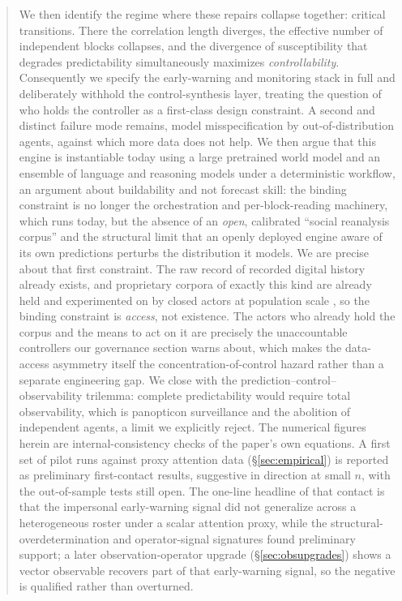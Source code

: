 \documentclass[11pt]{article}
\begin{document}
\begin{abstract}
We then identify the regime where these repairs collapse together: critical transitions. There the correlation length diverges, the effective number of independent blocks collapses, and the divergence of susceptibility that degrades predictability simultaneously maximizes \emph{controllability}. Consequently we specify the early-warning and monitoring stack in full and deliberately withhold the control-synthesis layer, treating the question of who holds the controller as a first-class design constraint. A second and distinct failure mode remains, model misspecification by out-of-distribution agents, against which more data does not help. We then argue that this engine is instantiable today using a large pretrained world model and an ensemble of language and reasoning models under a deterministic workflow, an argument about buildability and not forecast skill: the binding constraint is no longer the orchestration and per-block-reading machinery, which runs today, but the absence of an \emph{open}, calibrated ``social reanalysis corpus'' and the structural limit that an openly deployed engine aware of its own predictions perturbs the distribution it models. We are precise about that first constraint. The raw record of recorded digital history already exists, and proprietary corpora of exactly this kind are already held and experimented on by closed actors at population scale \cite{kramer2014}, so the binding constraint is \emph{access}, not existence. The actors who already hold the corpus and the means to act on it are precisely the unaccountable controllers our governance section warns about, which makes the data-access asymmetry itself the concentration-of-control hazard rather than a separate engineering gap. We close with the prediction--control--observability trilemma: complete predictability would require total observability, which is panopticon surveillance and the abolition of independent agents, a limit we explicitly reject. The numerical figures herein are internal-consistency checks of the paper's own equations. A first set of pilot runs against proxy attention data (\S\ref{sec:empirical}) is reported as preliminary first-contact results, suggestive in direction at small $n$, with the out-of-sample tests still open. The one-line headline of that contact is that the impersonal early-warning signal did not generalize across a heterogeneous roster under a scalar attention proxy, while the structural-overdetermination and operator-signal signatures found preliminary support; a later observation-operator upgrade (\S\ref{sec:obsupgrades}) shows a vector observable recovers part of that early-warning signal, so the negative is qualified rather than overturned.
\end{abstract}
\end{document}

